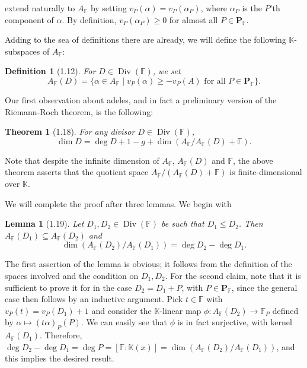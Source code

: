 \documentclass[11pt]{article}
\makeatletter
\theoremstyle{scplain}
\newtheorem*{definition}{Definition}
\newtheorem*{theorem}{Theorem}
\newtheorem*{lemma}{Lemma}
\renewenvironment{proof}[1][\proofname]{%
  \par\pushQED{\qed}\normalfont\topsep6\p@\@plus6\p@\relax
  \trivlist\item[\hskip\labelsep\scshape #1\@addpunct{.}]\ignorespaces}%
  {\popQED\endtrivlist\@endpefalse}
\DeclareMathOperator{\Div}{Div}
\makeatother
\begin{document}
\noindent
extend naturally to $A_{\mathbb{F}}$ by setting
$v_P(\alpha) = v_P(\alpha_P)$, where $\alpha_P$ is the $P$'th component of
$\alpha$. By definition, $v_P(\alpha_P) \geq 0$ for almost all
$P \in \mathbf{P}_{\mathbb{F}}$.

Adding to the sea of definitions there are already, we will define the following
$\mathbb{K}$-subspaces of $A_{\mathbb{F}}$:

\begin{definition}[1.12]
For $D \in \Div(\mathbb{F})$, we set
\[
  A_{\mathbb{F}}(D) =
    \{\alpha \in A_{\mathbb{F}} \mid v_P(\alpha) \geq -v_P(A)
      \text{ for all } P \in \mathbf{P}_{\mathbb{F}}\}.
\]
\end{definition}

Our first observation about adeles, and in fact a preliminary version of the
Riemann-Roch theorem, is the following:

\begin{theorem}[1.18]
For any divisor $D \in \Div(\mathbb{F})$,
\[
  \dim D = \deg D + 1 - g
    + \dim(A_{\mathbb{F}}/A_{\mathbb{F}}(D) + \mathbb{F}).
\]
\end{theorem}

\medskip{} Note that despite the infinite dimension of
$A_{\mathbb{F}}$, $A_{\mathbb{F}}(D)$ and $\mathbb{F}$, the above theorem
asserts that the quotient space
$A_{\mathbb{F}}/(A_{\mathbb{F}}(D)+\mathbb{F})$ is finite-dimensional over
$\mathbb{K}$.

We will complete the proof after three lemmas. We begin with

\begin{lemma}[1.19]
Let $D_1,D_2 \in \Div(\mathbb{F})$ be such that $D_1 \leq D_2$. Then
$A_{\mathbb{F}}(D_1) \subseteq A_{\mathbb{F}}(D_2)$ and
\[
  \dim(A_{\mathbb{F}}(D_2)/A_{\mathbb{F}}(D_1)) = \deg D_2 - \deg D_1.
\]
\end{lemma}

\begin{proof}
The first assertion of the lemma is obvious; it follows from the definition of
the spaces involved and the condition on $D_1,D_2$. For the second claim, note
that it is sufficient to prove it for in the case $D_2 = D_1 + P$, with
$P \in \mathbf{P}_{\mathbb{F}}$, since the general case then follows by an
inductive argument. Pick $t \in \mathbb{F}$ with
$v_P(t) = v_P(D_1) + 1$ and consider the $\mathbb{K}$-linear map
$\phi : A_{\mathbb{F}}(D_2) \longrightarrow \mathbb{F}_P$ defined by
$\alpha \mapsto (t\alpha)_P(P)$. We can easily see that $\phi$ is in fact
surjective, with kernel $A_{\mathbb{F}}(D_1)$. Therefore,
$\deg D_2 - \deg D_1 = \deg P = [\mathbb{F} : \mathbb{K}(x)]
= \dim(A_{\mathbb{F}}(D_2)/A_{\mathbb{F}}(D_1))$, and this implies the desired
result.
\end{proof}
\end{document}
